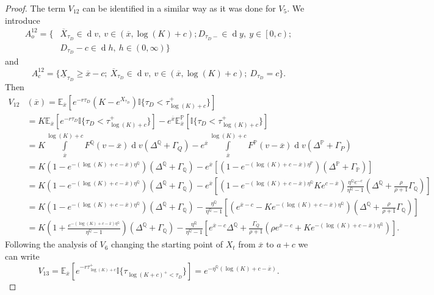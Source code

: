 \documentclass[10pt,a4paper]{amsart}
\def\E{{\mathbb{E}}}
\def\P{{\mathbb{P}}}
\def\Q{{\mathbb{Q}}}
\def \R{{{\rm I{\!}\rm R}}}
\def \I{{\mathbb{I}}}
\newcommand{\dx}{\operatorname{d}\!}
\def\P{{\mathbb P}} \def\le{\left} \def\ri{\right} \def\i{\infty}
\def\E{{\mathbb E}} \def\PP{\mc P} \def\Z{{\mathbb Z}} \def\R{{\mathbb R}}
\begin{document}
\begin{proof}
			The term $V_{12}$ can be identified in a similar way as it was done for $V_5$. We introduce
			\begin{align*}
				A_o^{12} = \{& \overline{X}_{\tau_D} \in \dx v,\ v \in (\overline{x}, \log(K)+c); D_{\tau_D-} \in \dx y,\ y \in \left[ 0,c \right); \\ \nonumber & D_{\tau_D} - c \in \dx h,\ h \in (0, \infty)
				\}
			\end{align*}
			and
			\begin{equation*}
				A_c^{12} = \{ \underline{X}_{\tau_D} \geq \overline{x}-c;\ \overline{X}_{\tau_D} \in \dx v,\ v \in (\overline{x},\log(K)+c);\  D_{\tau_D} =c \}.
			\end{equation*}
			Then
			\begin{align}
				\nonumber V_{12}&(\overline{x}) = \E_{\overline{x}}\left[ e^{-r\tau_D} \left( K - e^{X_{\tau_D}} \right) \I
				\{ \tau_D < \tau_{\log(K)+c}^+ \} \right] \\
				\nonumber & = K\E_{\overline{x}}\left[ e^{-r\tau_D} \I
				\{ \tau_D < \tau_{\log(K)+c}^+ \} \right] - e^{\overline{x}}\E^\P_{\overline{x}}\left[  \I
				\{ \tau_D < \tau_{\log(K)+c}^+ \} \right] \\
				\nonumber & = K\int\limits^{\log(K)+c}_{\overline{x}}F^\Q(v-\overline{x})\dx v \left( \Delta^\Q + \Gamma_Q \right)
				- e^{\overline{x}} \int\limits^{\log(K)+c}_{\overline{x}}F^\P(v-\overline{x})\dx v \left( \Delta^\P + \Gamma_P \right)
				\\
				\nonumber & = K \left(1 - e^{-(\log(K)+c-\overline{x})\eta^\Q}\right)\left( \Delta^\Q + \Gamma_\Q \right)   - e^{\overline{x}}\left[ \left(1 - e^{-(\log(K)+c-\overline{x})\eta^\P}\right)\left( \Delta^\P + \Gamma_\P \right)  \right]
				\\
				\nonumber & = K \left(1 - e^{-(\log(K)+c-\overline{x})\eta^\Q}\right)\left( \Delta^\Q + \Gamma_\Q \right)   - e^{\overline{x}}\left[ \left(1 - e^{-(\log(K)+c-\overline{x})\eta^\Q} Ke^{c-\overline{x}} \right)\frac{\eta^\Q e^{-c}}{\eta^\Q-1}\left( \Delta^\Q + \frac{\rho}{\rho+1}\Gamma_\Q \right)  \right]
				\\
				\nonumber & = K \left(1 - e^{-(\log(K)+c-\overline{x})\eta^\Q}\right)\left( \Delta^\Q + \Gamma_\Q \right)   - \frac{\eta^\Q}{\eta^\Q-1}\left[ \left(e^{\overline{x}-c} - Ke^{-(\log(K)+c-\overline{x})\eta^\Q}  \right)\left( \Delta^\Q + \frac{\rho}{\rho+1}\Gamma_\Q \right)  \right]
				\\
				& = K \left(1 + \frac{e^{-(\log(K)+c-\overline{x})\eta^\Q}}{\eta^\Q-1}\right)\left( \Delta^\Q + \Gamma_\Q \right)   - \frac{\eta^\Q}{\eta^\Q-1}\left[ e^{\overline{x}-c}\Delta^\Q + \frac{\Gamma_Q}{\rho+1}\left( \rho e^{\overline{x}-c} +  Ke^{-(\log(K)+c-\overline{x})\eta^\Q} \right)  \right]. \label{V12}
			\end{align}
			Following the analysis of $V_6$ changing the starting point of $X_t$ from $\overline{x}$ to $a+c$ we can write
			\begin{equation}\label{V13}
				V_{13} = \E_{\overline{x}}\left[ e^{-r\tau_{\log(K)+c}^+} \I
				\{ \tau_{\log(K+c)^+ < \tau_D} \} \right] = e^{-\eta^\Q (\log(K) + c - \overline{x})}.
			\end{equation}
			

\end{proof}
\end{document}

